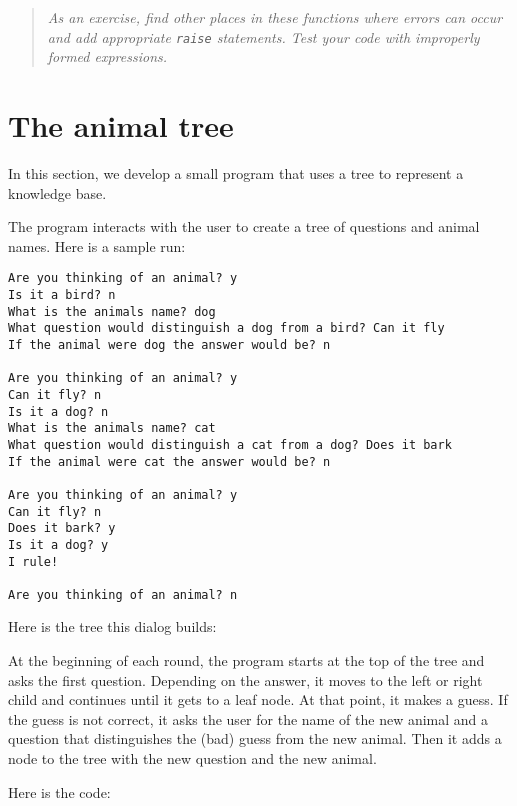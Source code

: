 \begin{quote}
{\em As an exercise, find other places in these functions where errors
can occur and add appropriate {\tt raise} statements.
Test your code with improperly
formed expressions.}
\end{quote}


\section{The animal tree}

In this section, we develop a small program that uses a tree
to represent a knowledge base.

The program interacts with the user to create a tree of questions
and animal names.  Here is a sample run:

\pagebreak

\beforeverb
\begin{verbatim}
Are you thinking of an animal? y
Is it a bird? n
What is the animals name? dog
What question would distinguish a dog from a bird? Can it fly
If the animal were dog the answer would be? n

Are you thinking of an animal? y
Can it fly? n
Is it a dog? n
What is the animals name? cat
What question would distinguish a cat from a dog? Does it bark
If the animal were cat the answer would be? n

Are you thinking of an animal? y
Can it fly? n
Does it bark? y
Is it a dog? y
I rule!

Are you thinking of an animal? n
\end{verbatim}
\afterverb
%
Here is the tree this dialog builds:

\beforefig
\centerline{}
\afterfig

At the beginning of each round, the program starts at the top of the
tree and asks the first question.  Depending on the answer, it moves
to the left or right child and continues until it gets to a leaf
node.  At that point, it makes a guess.  If the guess is not correct,
it asks the user for the name of the new animal and a question that
distinguishes the (bad) guess from the new animal.  Then it adds a
node to the tree with the new question and the new animal.

Here is the code:

\pagebreak

